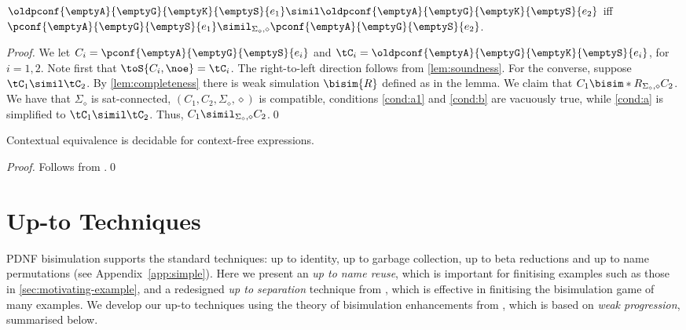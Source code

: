   \begin{theorem}\label{thm:complete}
  $\oldpconf{\emptyA}{\emptyG}{\emptyK}{\emptyS}{e_1} \simil \oldpconf{\emptyA}{\emptyG}{\emptyK}{\emptyS}{e_2}$
  iff 
  $\pconf{\emptyA}{\emptyG}{\emptyS}{e_1} \simil_{\Sigma_\diamond,\diamond} \pconf{\emptyA}{\emptyG}{\emptyS}{e_2}$.
\end{theorem}
\begin{proof}
We let $C_i=\pconf{\emptyA}{\emptyG}{\emptyS}{e_i}$ and $\tC_i=\oldpconf{\emptyA}{\emptyG}{\emptyK}{\emptyS}{e_i}$, for $i=1,2$.
  Note first that $\toS{C_i,\noe}=\tC_i$.
  The right-to-left direction follows from \cref{lem:soundness}. For the converse, suppose  $\tC_1\simil\tC_2$. By  \cref{lem:completeness} there is weak simulation $\bisim{R}$ defined as in the lemma. We claim that $C_1\bisim*R_{\Sigma_\diamond,\diamond}C_2$. We have that $\Sigma_\diamond$ is sat-connected, $(C_1,C_2,\Sigma_\diamond,\diamond)$ is compatible, conditions \cref{cond:a1} and \cref{cond:b} are  vacuously true, while 
 \cref{cond:a} is simplified to $\tC_1\simil\tC_2$. Thus, $C_1\simil_{\Sigma_\diamond,\diamond} C_2$.\qed
\end{proof}
\begin{corollary}
  Contextual equivalence is decidable for context-free expressions.
\end{corollary}
\begin{proof}
  Follows from .\qed
\end{proof}

  \section{Up-to Techniques}
  \label{sec:up-to}

PDNF bisimulation supports the standard techniques: 
up to identity, up to garbage collection, up to beta reductions and up to name permutations
(see Appendix~\ref{app:simple}).
Here we present an \emph{up to name reuse}, which is important for finitising examples such as those in \cref{sec:motivating-example}, and a redesigned \emph{up to separation} technique from \cite{KoutavasLT22}, which is effective in finitising the bisimulation game of many examples.
We develop our up-to techniques using the theory of bisimulation enhancements from \cite{PousS11,PousCompanion}, which is based on \emph{weak progression}, summarised below.


